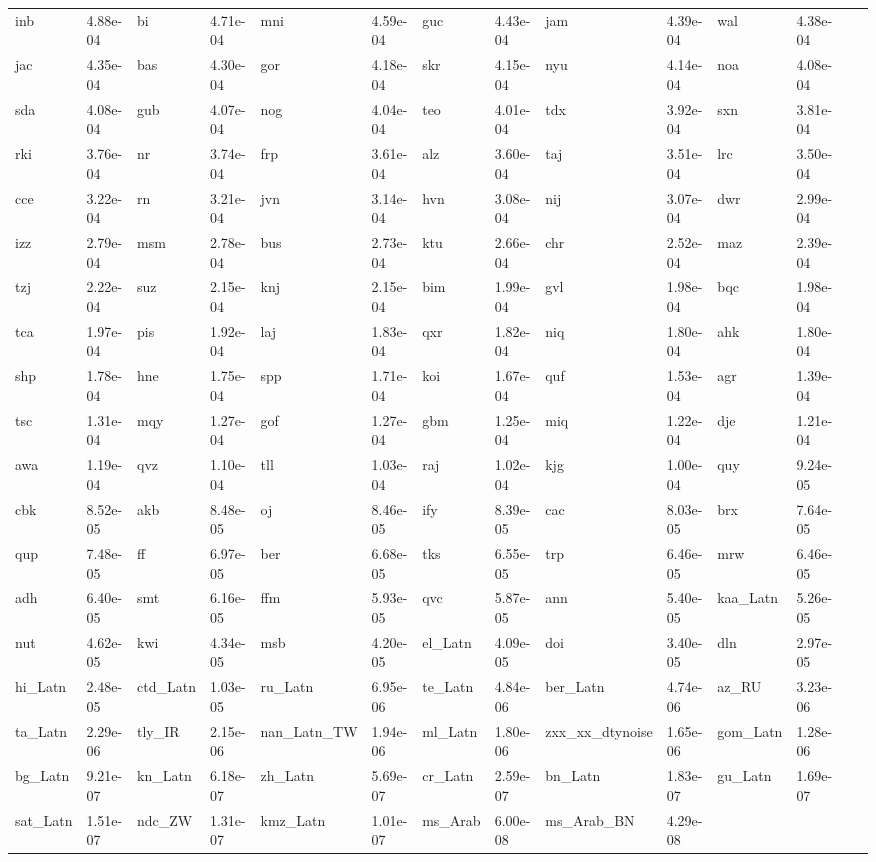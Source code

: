 \begin{table}
\begin{tabular}{ll|ll|ll|ll|ll|ll|ll}
inb & 4.88e-04 & bi & 4.71e-04 & mni & 4.59e-04 & guc & 4.43e-04 & jam & 4.39e-04 & wal & 4.38e-04 \\
jac & 4.35e-04 & bas & 4.30e-04 & gor & 4.18e-04 & skr & 4.15e-04 & nyu & 4.14e-04 & noa & 4.08e-04 \\
sda & 4.08e-04 & gub & 4.07e-04 & nog & 4.04e-04 & teo & 4.01e-04 & tdx & 3.92e-04 & sxn & 3.81e-04 \\
rki & 3.76e-04 & nr & 3.74e-04 & frp & 3.61e-04 & alz & 3.60e-04 & taj & 3.51e-04 & lrc & 3.50e-04 \\
cce & 3.22e-04 & rn & 3.21e-04 & jvn & 3.14e-04 & hvn & 3.08e-04 & nij & 3.07e-04 & dwr & 2.99e-04 \\
izz & 2.79e-04 & msm & 2.78e-04 & bus & 2.73e-04 & ktu & 2.66e-04 & chr & 2.52e-04 & maz & 2.39e-04 \\
tzj & 2.22e-04 & suz & 2.15e-04 & knj & 2.15e-04 & bim & 1.99e-04 & gvl & 1.98e-04 & bqc & 1.98e-04 \\
tca & 1.97e-04 & pis & 1.92e-04 & laj & 1.83e-04 & qxr & 1.82e-04 & niq & 1.80e-04 & ahk & 1.80e-04 \\
shp & 1.78e-04 & hne & 1.75e-04 & spp & 1.71e-04 & koi & 1.67e-04 & quf & 1.53e-04 & agr & 1.39e-04 \\
tsc & 1.31e-04 & mqy & 1.27e-04 & gof & 1.27e-04 & gbm & 1.25e-04 & miq & 1.22e-04 & dje & 1.21e-04 \\
awa & 1.19e-04 & qvz & 1.10e-04 & tll & 1.03e-04 & raj & 1.02e-04 & kjg & 1.00e-04 & quy & 9.24e-05 \\
cbk & 8.52e-05 & akb & 8.48e-05 & oj & 8.46e-05 & ify & 8.39e-05 & cac & 8.03e-05 & brx & 7.64e-05 \\
qup & 7.48e-05 & ff & 6.97e-05 & ber & 6.68e-05 & tks & 6.55e-05 & trp & 6.46e-05 & mrw & 6.46e-05 \\
adh & 6.40e-05 & smt & 6.16e-05 & ffm & 5.93e-05 & qvc & 5.87e-05 & ann & 5.40e-05 & kaa\_Latn & 5.26e-05 \\
nut & 4.62e-05 & kwi & 4.34e-05 & msb & 4.20e-05 & el\_Latn & 4.09e-05 & doi & 3.40e-05 & dln & 2.97e-05 \\
hi\_Latn & 2.48e-05 & ctd\_Latn & 1.03e-05 & ru\_Latn & 6.95e-06 & te\_Latn & 4.84e-06 & ber\_Latn & 4.74e-06 & az\_RU & 3.23e-06 \\
ta\_Latn & 2.29e-06 & tly\_IR & 2.15e-06 & nan\_Latn\_TW & 1.94e-06 & ml\_Latn & 1.80e-06 & zxx\_xx\_dtynoise & 1.65e-06 & gom\_Latn & 1.28e-06 \\
bg\_Latn & 9.21e-07 & kn\_Latn & 6.18e-07 & zh\_Latn & 5.69e-07 & cr\_Latn & 2.59e-07 & bn\_Latn & 1.83e-07 & gu\_Latn & 1.69e-07 \\
sat\_Latn & 1.51e-07 & ndc\_ZW & 1.31e-07 & kmz\_Latn & 1.01e-07 & ms\_Arab & 6.00e-08 & ms\_Arab\_BN & 4.29e-08 &  &  \\

\bottomrule
\end{tabular}
\label{tab:unimax-rates}
\end{table}